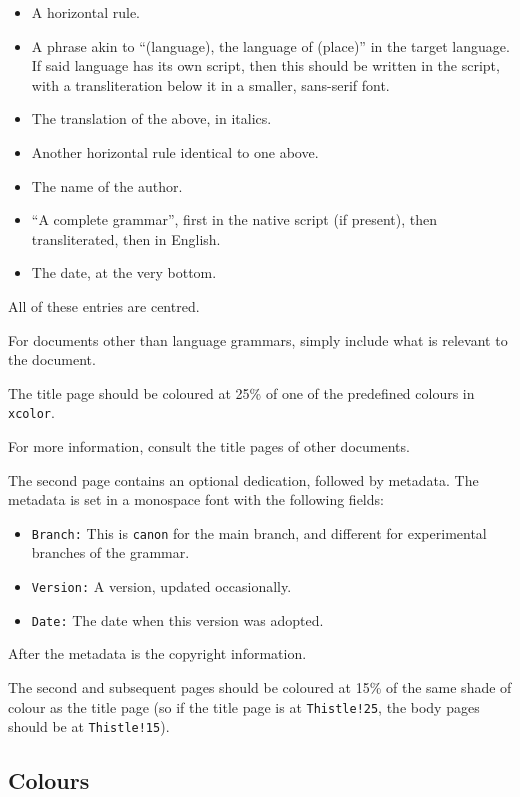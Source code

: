 \documentclass{book}
\begin{document}
\begin{itemize}
  \item A horizontal rule.
  \item A phrase akin to ``(language), the language of (place)'' in the target language. If said language has its own script, then this should be written in the script, with a transliteration below it in a smaller, sans-serif font.
  \item The translation of the above, in italics.
  \item Another horizontal rule identical to one above.
  \item The name of the author.
  \item ``A complete grammar'', first in the native script (if present), then transliterated, then in English.
  \item The date, at the very bottom.
\end{itemize}

All of these entries are centred.

For documents other than language grammars, simply include what is relevant to the document.

The title page should be coloured at 25\% of one of the predefined colours in \texttt{xcolor}.

For more information, consult the title pages of other documents.

The second page contains an optional dedication, followed by metadata. The metadata is set in a monospace font with the following fields:

\begin{itemize}
  \item \texttt{Branch:} This is \texttt{canon} for the main branch, and different for experimental branches of the grammar.
  \item \texttt{Version:} A version, updated occasionally.
  \item \texttt{Date:} The date when this version was adopted.
\end{itemize}

After the metadata is the copyright information.

The second and subsequent pages should be coloured at 15\% of the same shade of colour as the title page (so if the title page is at \texttt{Thistle!25}, the body pages should be at \texttt{Thistle!15}).

\subsection{Colours}
\end{document}
